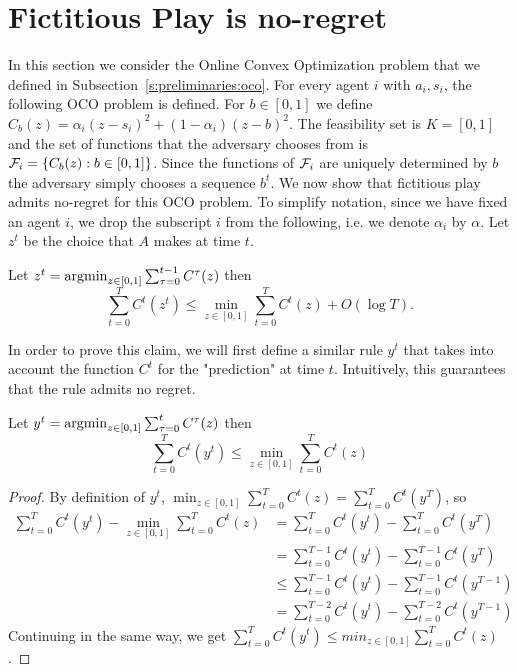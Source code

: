 \section{Fictitious Play is no-regret}\label{s:fictitious_noregret}

In this section we consider the Online Convex Optimization problem
that we defined in Subsection~\ref{s:preliminaries:oco}.
For every agent $i$ with $a_i, s_i$, the following OCO problem is defined.
For $b\in [0,1]$ we define $C_b(z) = \alpha_i(z-s_i)^2 + (1-\alpha_i)(z-b)^2$.
The feasibility set is $K = [0,1]$ and the set of functions that the
adversary chooses from is $\mathcal{F}_i = \{ C_b(z): b \in [0,1] \}$.
Since the functions of $\mathcal{F}_i$ are uniquely determined by $b$
the adversary simply chooses a sequence $b^t$.
We now show that fictitious play admits no-regret for this OCO problem.
To simplify notation, since we have fixed an agent $i$, we drop the subscript
$i$ from the following, i.e. we denote $\alpha_i$ by $\alpha$.
Let $z^t$ be the choice that $A$ makes at time $t$.
\begin{theorem}\label{t:no_regret}
  Let
  \(z^t = \operatorname*{argmin}_{ z \in [0,1]} \sum_{\tau = 0}^{t-1} C^\tau (z) \)
  then
  \[
    \sum_{t = 0}^{T} C^t(z^t) \leq
    \min_{ z \in [0,1]} \sum_{t=0}^T C^t(z) + O(\log  T).
  \]
\end{theorem}

In order to prove this claim, we will first define a similar rule $y^t$
that takes into account the function $C^t$ for the "prediction" at time $t$.
Intuitively, this guarantees that the rule admits no regret.

\begin{lemma}
  Let
  \(y^t = \operatorname*{argmin}_{z \in [0,1]} \sum_{\tau = 0}^t C^\tau (z)\)
  then
  \[
    \sum_{t=0}^T C^t(y^t) \leq \min_{z \in [0,1]} \sum_{t=0}^T C^t(z)
  \]
\end{lemma}

\begin{proof}By definition of $y^t$,
  $\min_{ z \in [0,1]} \sum_{t=0}^T C^t(z) = \sum_{t=0}^T C^t(y^T)$, so
  \begin{align*}
    \sum_{t=0}^T C^t(y^t) - \min_{ z \in [0,1]} \sum_{t=0}^T C^t(z) &=
    \sum_{t=0}^T C^t(y^t) - \sum_{t=0}^T C^t(y^T)\\
    &= \sum_{t=0}^{T-1} C^t(y^t) - \sum_{t=0}^{T-1} C^t(y^T)\\
    &\leq \sum_{t=0}^{T-1} C^t(y^t) - \sum_{t=0}^{T-1} C^t(y^{T-1})\\
    &= \sum_{t=0}^{T-2} C^t(y^t) - \sum_{t=0}^{T-2} C^t(y^{T-1})
  \end{align*}
  Continuing in the same way, we get
  $\sum_{t=0}^T C^t(y^t) \leq min_{ z \in [0,1]} \sum_{t=0}^T C^t(z)$.
\end{proof}

